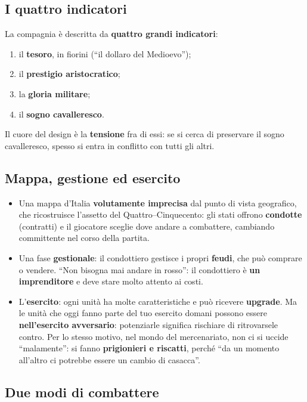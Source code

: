 \subsection{I quattro indicatori}

La compagnia è descritta da \textbf{quattro grandi indicatori}:
\begin{enumerate}
  \item il \textbf{tesoro}, in fiorini (``il dollaro del Medioevo'');
  \item il \textbf{prestigio aristocratico};
  \item la \textbf{gloria militare};
  \item il \textbf{sogno cavalleresco}.
\end{enumerate}
Il cuore del design è la \textbf{tensione} fra di essi: se si cerca di preservare
il sogno cavalleresco, spesso si entra in conflitto con tutti gli altri.

\subsection{Mappa, gestione ed esercito}

\begin{itemize}
  \item Una mappa d'Italia \textbf{volutamente imprecisa} dal punto di vista
        geografico, che ricostruisce l'assetto del Quattro--Cinquecento: gli
        stati offrono \textbf{condotte} (contratti) e il giocatore sceglie dove
        andare a combattere, cambiando committente nel corso della partita.
  \item Una fase \textbf{gestionale}: il condottiero gestisce i propri
        \textbf{feudi}, che può comprare o vendere. ``Non bisogna mai andare in
        rosso'': il condottiero è \textbf{un imprenditore} e deve stare molto
        attento ai costi.
  \item L'\textbf{esercito}: ogni unità ha molte caratteristiche e può ricevere
        \textbf{upgrade}. Ma le unità che oggi fanno parte del tuo esercito
        domani possono essere \textbf{nell'esercito avversario}: potenziarle
        significa rischiare di ritrovarsele contro. Per lo stesso motivo, nel
        mondo del mercenariato, non ci si uccide ``malamente'': si fanno
        \textbf{prigionieri e riscatti}, perché ``da un momento all'altro ci
        potrebbe essere un cambio di casacca''.
\end{itemize}

\subsection{Due modi di combattere}

